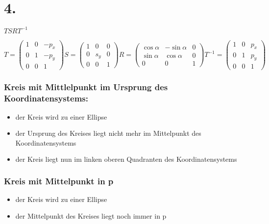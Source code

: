 \documentclass[12pt]{scrreprt}
\begin{document}
\section*{4.}

\begin{center}
\(
T S R T^{-1}
\)
\end{center}

\(
T = \left(
	\begin{array}{ccc}
		1 & 0 & -p_{x} \\
		0 & 1 & -p_{y} \\
		0 & 0 & 1
	\end{array}
\right)
S = \left(
	\begin{array}{ccc}
		1 & 0 & 0 \\
		0 & s_{y} & 0 \\
		0 & 0 & 1
	\end{array}
\right)
R = \left(
	\begin{array}{ccc}
		\cos\alpha & -\sin\alpha & 0 \\
		\sin\alpha & \cos\alpha & 0 \\
		0 & 0 & 1
	\end{array}
\right)
T^{-1} = \left(
	\begin{array}{ccc}
		1 & 0 & p_{x} \\
		0 & 1 & p_{y} \\
		0 & 0 & 1
	\end{array}
\right)
\)

\subsubsection*{Kreis mit Mittlelpunkt im Ursprung des Koordinatensystems:}

\begin{itemize}
  \item der Kreis wird zu einer Ellipse
  \item der Ursprung des Kreises liegt nicht mehr im Mittelpunkt des
Koordinatensystems
  \item der Kreis liegt nun im linken oberen Quadranten des Koordinatensystems
\end{itemize}

\subsubsection*{Kreis mit Mittelpunkt in p}

\begin{itemize}
  \item der Kreis wird zu einer Ellipse
  \item der Mittelpunkt des Kreises liegt noch immer in p
\end{itemize}
\end{document}
